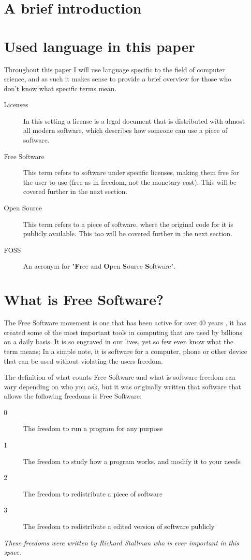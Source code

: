 \documentclass[a4paper,12pt]{article}
\begin{document}
{\setlength{\parindent}{0cm}

\section{A brief introduction}

\section{Used language in this paper}
Throughout this paper I will use language specific to the field of computer science, and as such
it makes sense to provide a brief overview for those who don't know what specific terms mean.

\begin{description}
	\item[Licenses] In this setting a license is a legal document that is distributed with
		almost all modern software, which describes how someone can use a piece of software.
	\item[Free Software] This term refers to software under specific licenses, making them 
		free for the user to use (free as in freedom, not the monetary cost). This will
		be covered further in the next section.
	\item[Open Source] This term refers to a piece of software, where the original code for it
		is publicly available. This too will be covered further in the next section.
	\item[FOSS] An acronym for "\textbf{F}ree and \textbf{O}pen \textbf{S}ource \textbf{S}oftware".
\end{description}

\section{What is Free Software?}
The Free Software movement is one that has been active for over 40 years \cite{GNUmaifesto}, it has
created some of the most important tools in computing that are used by billions on a daily basis. 
It is so engraved in our lives, yet so few even know what the term means; In a simple note, it is
software for a computer, phone or other device that can be used without violating the users 
freedom.

The definition of what counts Free Software and what is software freedom can vary depending on who 
you ask, but it was originally written that software that allows the following freedoms is 
Free Software:

\begin{description}
	\item[0] The freedom to run a program for any purpose
	\item[1] The freedom to study how a program works, and modify it to your needs
	\item[2] The freedom to redistribute a piece of software
	\item[3] The freedom to redistribute a edited version of software publicly
\end{description}
\textit{These freedoms were written by Richard Stallman\cite{FOSSdef} who is ever 
	important in this space.}

}
\end{document}
